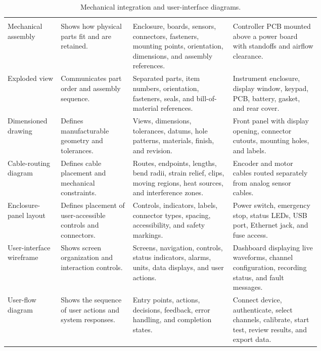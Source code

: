 
\begin{singlespace}
\setlength{\LTcapwidth}{\linewidth}
\begin{longtable}{@{}L{0.17\linewidth} L{0.23\linewidth} L{0.32\linewidth} L{\tabcolsep\relax}@{}}
\caption{Mechanical integration and user-interface diagrams.}\label{tab:physical-diagrams}\\
 &  &  &  \\
\midrule
\endfirsthead
{}
 &  &  &  \\
\midrule
\endhead
\bottomrule
\endfoot
Mechanical assembly & Shows how physical parts fit and are retained. & Enclosure, boards, sensors, connectors, fasteners, mounting points, orientation, dimensions, and assembly references. & Controller PCB mounted above a power board with standoffs and airflow clearance. \\
\addlinespace[3pt]
Exploded view & Communicates part order and assembly sequence. & Separated parts, item numbers, orientation, fasteners, seals, and bill-of-material references. & Instrument enclosure, display window, keypad, PCB, battery, gasket, and rear cover. \\
\addlinespace[3pt]
Dimensioned drawing & Defines manufacturable geometry and tolerances. & Views, dimensions, tolerances, datums, hole patterns, materials, finish, and revision. & Front panel with display opening, connector cutouts, mounting holes, and labels. \\
\addlinespace[3pt]
Cable-routing diagram & Defines cable placement and mechanical constraints. & Routes, endpoints, lengths, bend radii, strain relief, clips, moving regions, heat sources, and interference zones. & Encoder and motor cables routed separately from analog sensor cables. \\
\addlinespace[3pt]
Enclosure-panel layout & Defines placement of user-accessible controls and connectors. & Controls, indicators, labels, connector types, spacing, accessibility, and safety markings. & Power switch, emergency stop, status LEDs, USB port, Ethernet jack, and fuse access. \\
\addlinespace[3pt]
User-interface wireframe & Shows screen organization and interaction controls. & Screens, navigation, controls, status indicators, alarms, units, data displays, and user actions. & Dashboard displaying live waveforms, channel configuration, recording status, and fault messages. \\
\addlinespace[3pt]
User-flow diagram & Shows the sequence of user actions and system responses. & Entry points, actions, decisions, feedback, error handling, and completion states. & Connect device, authenticate, select channels, calibrate, start test, review results, and export data. \\
\end{longtable}
\end{singlespace}

